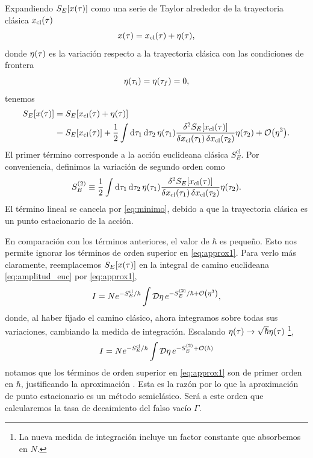 Expandiendo $S_E\qty[x\qty(\tau)]$ como una serie de Taylor alrededor de la trayectoria clásica $x_{\text{cl}}\qty(\tau)$
\begin{equation} \label{eq:trayec}
	x\qty(\tau) = x_{\textrm{cl}}\qty(\tau) + \eta\qty(\tau),
\end{equation}
donde $\eta\qty(\tau)$ es la variación respecto a la trayectoria clásica con las condiciones de frontera
\begin{equation}
	\eta\qty(\tau_i) = \eta\qty(\tau_f) = 0,
\end{equation}
tenemos
\begin{align} 
S_{E}\qty[x\qty(\tau)] &= S_{E}[x_{\textrm{cl}}(\tau) +  \eta\qty(\tau)] \\ 
&= S_{E}[x_{\textrm{cl}}\qty(\tau)]
+ \frac{1}{2} \int \dd{\tau_1} \dd{\tau_2} \eta(\tau_1) \frac{\delta^2 S_E[x_{\textrm{cl}}\qty(\tau)]}{\var{x_{\textrm{cl}}\qty(\tau_1)} \var{x_{\textrm{cl}}\qty(\tau_2)}} \eta\qty(\tau_2) + \order{\eta^3}. \label{eq:approx1}
\end{align}
El primer término corresponde a la acción euclideana clásica  $S_E^{\textrm{cl}}$. Por conveniencia, definimos la variación de segundo orden como
\begin{equation}
	S_E^{(2)} \equiv \frac{1}{2} \int \dd{\tau_1} \dd{\tau_2} \eta\qty(\tau_1) \frac{\delta^2 S_E[x_{\textrm{cl}}\qty(\tau)]}{\var{x_{\textrm{cl}}(\tau_1)} \var{x_{\textrm{cl}}\qty(\tau_2)}} \eta\qty(\tau_2). \label{eq:S_2}
\end{equation}
El término lineal se cancela  por \eqref{eq:minimo}, debido a que la trayectoria clásica es un punto estacionario de la acción. 

En comparación con los términos anteriores, el valor de $\hbar$ es pequeño. Esto nos permite ignorar los términos de orden superior en \eqref{eq:approx1}. Para verlo más claramente, reemplacemos $S_{E}\qty[x\qty(\tau)]$ en la integral de camino euclideana \eqref{eq:amplitud_euc} por \eqref{eq:approx1},
\begin{equation}\label{eq:Iaprox1}
I = N e^{-S_E^{\textrm{cl}}/\hbar} \int \mathcal{D}\eta \, e^{-S_E^{(2)}/\hbar + \order{\eta^3}},
\end{equation}
donde, al haber fijado el camino clásico, ahora integramos sobre todas sus variaciones, cambiando la medida de integración. Escalando $\eta\qty(\tau) \rightarrow \sqrt{\hbar}\eta\qty(\tau)$ \footnote{La nueva medida de integración incluye un factor constante que absorbemos en $N$.},
\begin{equation}\label{eq:Iaprox2}
I = N e^{-S_E^{\textrm{cl}}/\hbar} \int \mathcal{D}\eta \, e^{-S_E^{(2)} + \order{\hbar}}
\end{equation}
notamos que los términos de orden superior en \eqref{eq:approx1} son de primer orden en $\hbar$, justificando la aproximación \cite{paranjape2017theory}. Esta es la razón por lo que la aproximación de punto estacionario es un método semiclásico. Será a este orden que calcularemos la tasa de decaimiento del falso vacío $\Gamma$. 


